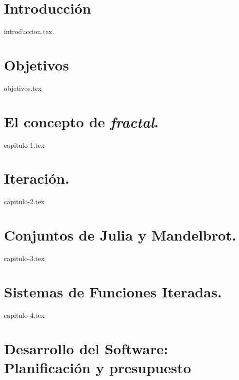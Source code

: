 \documentclass[twoside,openright,11pt]{report}
\begin{document}
\listoftables
\thispagestyle{plain}


\chapter*{Introducción}
\setcounter{page}{1}


{introduccion.tex}

\chapter*{Objetivos}
\label{chap:Objetivos}

{objetivos.tex}

\chapter{El concepto de \textit{fractal}.}
\label{chap:concepto}

{capitulo-1.tex}

\chapter{Iteración.}
\label{chap:iteracion}

{capitulo-2.tex}


\chapter{Conjuntos de Julia y Mandelbrot.}
\label{chap:Julia-Mandelbrot}

{capitulo-3.tex}

\chapter{Sistemas de Funciones Iteradas.}
\label{chap:SFI}

{capitulo-4.tex}

\chapter*{Desarrollo del Software: Planificación y presupuesto}
\label{chap:planificacion-presupuesto}
\end{document}
